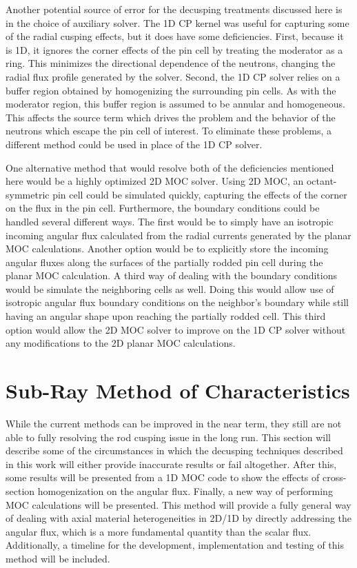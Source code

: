 Another potential source of error for the decusping treatments discussed here is in the choice of auxiliary solver.  The 1D CP kernel was useful for capturing some of the radial cusping effects, but it does have some deficiencies.  First, because it is 1D, it ignores the corner effects of the pin cell by treating the moderator as a ring.  This minimizes the directional dependence of the neutrons, changing the radial flux profile generated by the solver.  Second, the 1D CP solver relies on a buffer region obtained by homogenizing the surrounding pin cells.  As with the moderator region, this buffer region is assumed to be annular and homogeneous.  This affects the source term which drives the problem and the behavior of the neutrons which escape the pin cell of interest.  To eliminate these problems, a different method could be used in place of the 1D CP solver.  

One alternative method that would resolve both of the deficiencies mentioned here would be a highly optimized 2D MOC solver.  Using 2D MOC, an octant-symmetric pin cell could be simulated quickly, capturing the effects of the corner on the flux in the pin cell.  Furthermore, the boundary conditions could be handled several different ways.  The first would be to simply have an isotropic incoming angular flux calculated from the radial currents generated by the planar MOC calculations.  Another option would be to explicitly store the incoming angular fluxes along the surfaces of the partially rodded pin cell during the planar MOC calculation.  A third way of dealing with the boundary conditions would be simulate the neighboring cells as well.  Doing this would allow use of isotropic angular flux boundary conditions on the neighbor's boundary while still having an angular shape upon reaching the partially rodded cell.  This third option would allow the 2D MOC solver to improve on the 1D CP solver without any modifications to the 2D planar MOC calculations.

\section{Sub-Ray Method of Characteristics}

While the current methods can be improved in the near term, they still are not able to fully resolving the rod cusping issue in the long run.  This section will describe some of the circumstances in which the decusping techniques described in this work will either provide inaccurate results or fail altogether.  After this, some results will be presented from a 1D MOC code to show the effects of cross-section homogenization on the angular flux.  Finally, a new way of performing MOC calculations will be presented.  This method will provide a fully general way of dealing with axial material heterogeneities in 2D/1D by directly addressing the angular flux, which is a more fundamental quantity than the scalar flux.  Additionally, a timeline for the development, implementation and testing of this method will be included.

